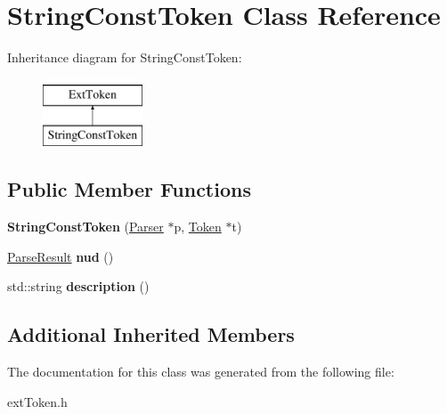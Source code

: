 \hypertarget{classStringConstToken}{\section{String\-Const\-Token Class Reference}
\label{classStringConstToken}
}
Inheritance diagram for String\-Const\-Token\-:\begin{figure}[H]
\begin{center}
\leavevmode
\includegraphics[height=2.000000cm]{classStringConstToken}
\end{center}
\end{figure}
\subsection*{Public Member Functions}
\begin{DoxyCompactItemize}
\item 
\hypertarget{classStringConstToken_aba75cdaef187138a572ba49a5c279fcf}{{\bfseries String\-Const\-Token} (\hyperlink{classParser}{Parser} $\ast$p, \hyperlink{classToken}{Token} $\ast$t)}\label{classStringConstToken_aba75cdaef187138a572ba49a5c279fcf}

\item 
\hypertarget{classStringConstToken_a4767bba84d30289ab31d501f240b80fb}{\hyperlink{classParseResult}{Parse\-Result} {\bfseries nud} ()}\label{classStringConstToken_a4767bba84d30289ab31d501f240b80fb}

\item 
\hypertarget{classStringConstToken_a6343169471a6cb6e422496f2f640691f}{std\-::string {\bfseries description} ()}\label{classStringConstToken_a6343169471a6cb6e422496f2f640691f}

\end{DoxyCompactItemize}
\subsection*{Additional Inherited Members}


The documentation for this class was generated from the following file\-:\begin{DoxyCompactItemize}
\item 
ext\-Token.\-h\end{DoxyCompactItemize}
